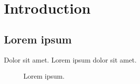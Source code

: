 \documentclass[main.tex]{subfiles}
\begin{document}
\section{Introduction}

\subsection{Lorem ipsum}

Dolor sit amet\cite{LoremIpsum2018}. Lorem ipsum dolor sit amet.

\begin{figure}[H]
    \centering
    \caption{Lorem ipsum.}
\end{figure}
\end{document}
